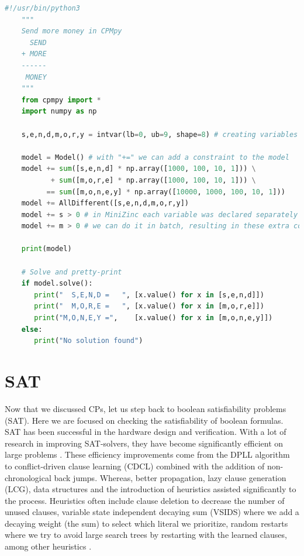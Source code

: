 \begin{lstlisting}[language=python, label={lst:SendMoreMoneyCPMpy},  caption={Solution to the puzzle “send more money”. Modified from the example in the CPMpy repository \url{https://github.com/CPMpy/cpmpy/blob/master/examples/send_more_money.py}}]
	#!/usr/bin/python3
	"""
	Send more money in CPMpy
	  SEND
	+ MORE
	------
	 MONEY
	"""
	from cpmpy import *
	import numpy as np
	
	s,e,n,d,m,o,r,y = intvar(lb=0, ub=9, shape=8) # creating variables
	
	model = Model() # with "+=" we can add a constraint to the model
	model += sum([s,e,n,d] * np.array([1000, 100, 10, 1])) \
	       + sum([m,o,r,e] * np.array([1000, 100, 10, 1])) \
	      == sum([m,o,n,e,y] * np.array([10000, 1000, 100, 10, 1]))
	model += AllDifferent([s,e,n,d,m,o,r,y])
	model += s > 0 # in MiniZinc each variable was declared separately in CPMpy 
	model += m > 0 # we can do it in batch, resulting in these extra constraints 
	
	print(model)
	
	# Solve and pretty-print
	if model.solve():
	   print("  S,E,N,D =   ", [x.value() for x in [s,e,n,d]])
	   print("  M,O,R,E =   ", [x.value() for x in [m,o,r,e]])
	   print("M,O,N,E,Y =",    [x.value() for x in [m,o,n,e,y]])
	else:
	   print("No solution found")
\end{lstlisting}



\section{SAT}
\label{CS:SAT}
Now that we discussed CPs, let us step back to boolean satisfiability problems (SAT). Here we are focused on checking the satisfiability of boolean formulas. SAT has been successful in the hardware design and verification. With a lot of research in improving SAT-solvers, they have become significantly efficient on large problems \cite{56bardin2019bringing}.
These efficiency improvements come from the DPLL algorithm to conflict-driven clause learning (CDCL) combined with the addition of non-chronological back jumps. Whereas, better propagation, lazy clause generation (LCG), data structures and the introduction of heuristics assisted significantly to the process. Heuristics often include clause deletion to decrease the number of unused clauses, variable state independent decaying sum (VSIDS) where we add a decaying weight (the sum) to select which literal we prioritize, random restarts where we try to avoid large search trees by restarting with the learned clauses, among other heuristics \cite{61MCSMarcDenecker, 60katebi2011empirical, 67stuckey2010lazyClauseGeneration}.

